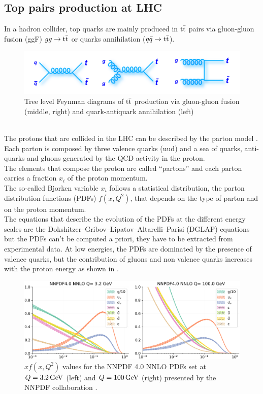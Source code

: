 \subsection{Top pairs production at LHC}
In a hadron collider, top quarks are mainly produced in ${{\text{t}}{\bar{\text{t}}}}$ pairs via gluon-gluon fusion (ggF) $gg \to {\ensuremath{{\text{t}}{\bar{\text{t}}}}}$ or quarks annihilation (${q}\bar{{q}} \to {\ensuremath{{\text{t}}{\bar{\text{t}}}}}$).
\begin{figure}[h!]
    \centering
    \includegraphics[width=0.8\linewidth]{fig//chap02-theory/ttbar.png}
    \caption{Tree level Feynman diagrams of ${{\text{t}}{\bar{\text{t}}}}$ production via gluon-gluon fusion (middle, right) and quark-antiquark annihilation (left)}
    \label{fig:tt_prod}
\end{figure}\\
The protons that are collided in the LHC can be described by the parton model \cite{Feynman1969TheEnergies}.\\
Each parton is composed by three valence quarks (uud) and a sea of quarks, anti-quarks and gluons generated by the QCD activity in the proton.\\ 
The elements that compose the proton are called “partons” and each parton carries a fraction $x_i$ of the proton momentum.\\
The so-called Bjorken variable $x_i$ follows a statistical distribution, the parton distribution functions (PDFs) $f(x,Q^2)$, that depends on the type of parton and on the proton momentum.\\
The equations that describe the evolution of the PDFs at the different energy scales are the Dokshitzer–Gribov–Lipatov–Altarelli–Parisi (DGLAP) equations \cite{Altarelli1977AsymptoticLanguage,Gribov1972DeepTheory,Dokshitzer1977CalculationChromodynamics.} but the PDFs can't be computed a priori, they have to be extracted from experimental data.
At low energies, the PDFs are dominated by the presence of valence quarks, but the contribution of gluons and non valence quarks increases with the proton energy as shown in .
\\
\begin{figure}[h!]
    \centering
    \includegraphics[width=1\linewidth]{fig//chap02-theory/pdf.png}
    \caption{$xf(x,Q^2)$ values for the NNPDF 4.0 NNLO PDFs set at $Q=3.2{\,\text{Ge\hspace{-.08em}V}}$ (left) and $Q=100 {\,\text{Ge\hspace{-.08em}V}}$ (right) presented by the NNPDF collaboration \cite{Ball2022TheAccuracy}. }
    \label{fig:pdf}
\end{figure}
